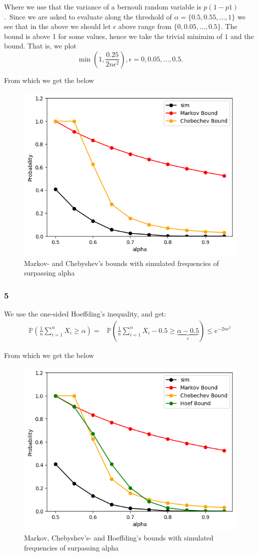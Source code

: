\documentclass[a4paper,12pt]{article}
\begin{document}
Where we use that the variance of a bernouli random variable is $p(1-p1)$.\
Since we are asked to evaluate along the threshold of $\alpha = \{0.5, 0.55, \dots, 1\}$ we see that in the above we should let $\epsilon$ above range from $\{0, 0.05, \dots, 0.5 \}$. The bound is above 1 for some values, hence we take the trivial minimim of $1$ and the bound. That is, we plot
$$
\min\left( 1, \frac{0.25}{2n\epsilon^2} \right), \epsilon = 0, 0.05, \dots, 0.5.
$$

From which we get the below 
\begin{figure}[htbp]
    \centering
    \includegraphics[width=0.5\linewidth]{HA2_2a_3.png}
    \caption{Markov- and Chebyshev’s bounds with simulated frequencies of surpassing alpha} %
    \label{fig:2}
\end{figure}

\subsubsection*{5}
We use the one-sided  Hoeffding’s inequality, and get:
\begin{align}
\mathbb{P}\left(  \frac{1}{n}\sum_{i = 1}^nX_i \geq \alpha \right) =  
&\mathbb{P}\left(  \frac{1}{n}\sum_{i = 1}^nX_i - 0.5 \geq \underbrace{\alpha - 0.5}_{\epsilon} \right) \leq e^{-2n\epsilon^2}
\end{align}

From which we get the below 
\begin{figure}[htbp]
    \centering
    \includegraphics[width=0.5\linewidth]{HA2_2a_4.png}
    \caption{Markov, Chebyshev’s- and  Hoeffding’s bounds with simulated frequencies of surpassing alpha} %
    \label{fig:3}
\end{figure}
\end{document}

